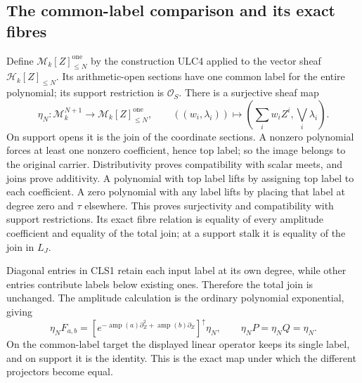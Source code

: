 \documentclass[11pt,a4paper]{article}
\theoremstyle{definition}\newtheorem{definition}[theorem]{Definition}
\begin{document}
\subsection{The common-label comparison and its exact fibres}
Define $\mathcal M_k[Z]_{\le N}^{\mathrm{one}}$ by the construction
ULC4 applied to the vector sheaf $\mathcal H_k[Z]_{\le N}$.
Its arithmetic-open sections have one common label for the entire
polynomial; its support restriction is $\mathcal O_S$.
There is a surjective sheaf map
\begin{equation}\tag{CLS7}
 \eta_N:\mathcal M_k^{N+1}\longrightarrow
 \mathcal M_k[Z]_{\le N}^{\mathrm{one}},\qquad
 ((w_i,\lambda_i))\longmapsto
       \left(\sum_iw_iZ^i,\bigvee_i\lambda_i\right).
\end{equation}
On support opens it is the join of the coordinate sections.
A nonzero polynomial forces at least one nonzero coefficient,
hence top label; so the image belongs to the original carrier.
Distributivity proves compatibility with scalar meets, and joins
prove additivity. A polynomial with top label lifts by assigning
top label to each coefficient. A zero polynomial with any label
lifts by placing that label at degree zero and $\tau$ elsewhere.
This proves surjectivity and compatibility with support restrictions.
Its exact fibre relation is equality of every amplitude coefficient
and equality of the total join; at a support stalk it is equality
of the join in $L_J$.

Diagonal entries in CLS1 retain each input label at its own degree,
while other entries contribute labels below existing ones. Therefore
the total join is unchanged. The amplitude calculation is the
ordinary polynomial exponential, giving
\begin{equation}\tag{CLS8}
 \eta_NF_{a,b}=
 \left[e^{-\operatorname{amp}(a)\partial_Z^2+
                   \operatorname{amp}(b)\partial_Z}\right]^\uparrow
 \eta_N,\qquad \eta_NP=\eta_NQ=\eta_N.
\end{equation}
On the common-label target the displayed linear operator keeps its
single label, and on support it is the identity. This is the exact
map under which the different projectors become equal.
\end{document}
